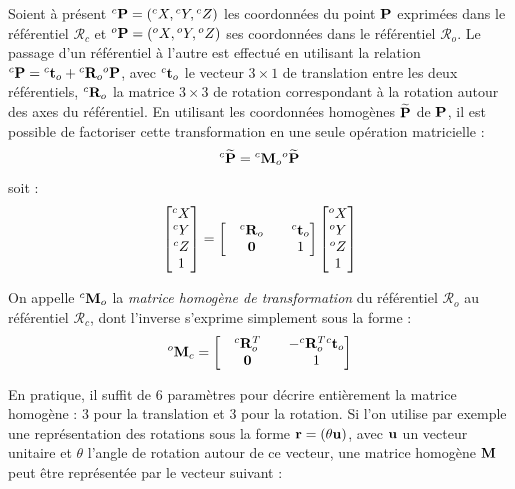 Soient \`a pr\'esent ${}^c{\bf P} = ({}^cX, {}^cY, {}^cZ)$ les coordonnées du 
point ${\bf P}$ exprimées dans le référentiel $\mathcal R_c$ et ${}^o{\bf P} = 
({}^oX, {}^oY, {}^oZ)$ ses coordonnées dans le référentiel $\mathcal R_o$. Le 
passage d'un référentiel à l'autre est effectué en utilisant la relation 
${}^c{\bf P} = {}^c{\bf t}_o + {}^c{\bf R}_o {}^o{\bf P}$, avec ${}^c{\bf t}_o$ 
le vecteur $3\times 1$ de translation entre les deux référentiels, ${}^c{\bf 
R}_o$ la matrice $3\times 3$ de rotation correspondant à la rotation autour des 
axes du référentiel. En utilisant les coordonnées homogènes $\widetilde {\bf P}$ 
de ${\bf P}$, il est possible de factoriser cette transformation en une seule 
opération matricielle :
\begin{equation}
{}^c \widetilde {\bf P} = {}^c {\bf M}_o {}^o \widetilde {\bf P}
\label{chap01:eq07}
\end{equation}
soit :
\begin{equation}
\begin{bmatrix}
{}^cX \\ {}^cY \\ {}^cZ \\ 1
\end{bmatrix}
=
\begin{bmatrix}
&  {}^c{\bf R}_o & & {}^c{\bf t}_o \\
& {\bf 0} & & 1
\end{bmatrix}
\begin{bmatrix}
{}^oX \\ {}^oY \\ {}^oZ \\ 1
\end{bmatrix}
\label{chap01:eq08}
\end{equation}

On appelle ${}^c{\bf M}_o$ la {\it matrice homogène de transformation} du 
référentiel $\mathcal R_o$ au référentiel $\mathcal R_c$, dont l'inverse 
s'exprime simplement sous la forme :
\begin{equation}
{}^o{\bf M}_c = 
\begin{bmatrix}
&  {}^c{\bf R}_o^T & & -{}^c{\bf R}_o^T {}^c{\bf t}_o \\
& {\bf 0} & & 1
\end{bmatrix}
\label{chap01:eq09}
\end{equation}

En pratique, il suffit de $6$ param\`etres pour d\'ecrire enti\`erement la 
matrice homog\`ene : $3$ pour la translation et $3$ pour la rotation. Si l'on 
utilise par exemple une repr\'esentation des rotations sous la forme ${\bf r} = 
(\theta {\bf u})$, avec $\bf u$ un vecteur unitaire et $\theta$ l'angle de 
rotation autour de ce vecteur, une matrice homog\`ene ${\bf M}$ peut \^etre 
repr\'esent\'ee par le vecteur suivant :

